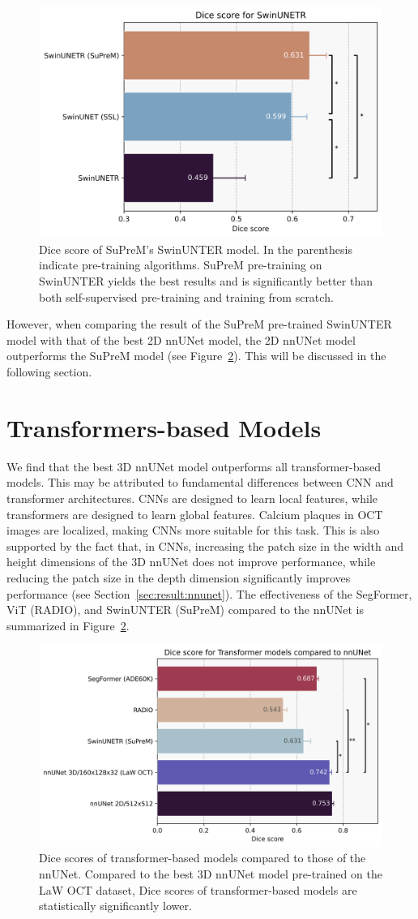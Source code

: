 \documentclass[a4paper,11pt,oneside]{report}
\begin{document}
\begin{figure}[hbt]
    \centering
    \includegraphics[width=0.5\linewidth]{figures/result_SwinUNETR_results.png}
    \caption{Dice score of SuPreM's SwinUNTER model. In the parenthesis indicate pre-training algorithms. SuPreM pre-training on SwinUNTER yields the best results and is significantly better than both self-supervised pre-training and training from scratch.}
    \label{fig:suprem-results}
\end{figure}

However, when comparing the result of the SuPreM pre-trained SwinUNTER model with that of the best 2D nnUNet model, the 2D nnUNet model outperforms the SuPreM model (see Figure~\ref{fig:transformer-results}). This will be discussed in the following section.

\section{Transformers-based Models}
We find that the best 3D nnUNet model outperforms all transformer-based models. This may be attributed to fundamental differences between CNN and transformer architectures. CNNs are designed to learn local features, while transformers are designed to learn global features. Calcium plaques in OCT images are localized, making CNNs more suitable for this task. This is also supported by the fact that, in CNNs, increasing the patch size in the width and height dimensions of the 3D nnUNet does not improve performance, while reducing the patch size in the depth dimension significantly improves performance (see Section~\ref{sec:result:nnunet}). The effectiveness of the SegFormer, ViT (RADIO), and SwinUNTER (SuPreM) compared to the nnUNet is summarized in Figure~\ref{fig:transformer-results}.

\begin{figure}[hbt]
    \centering
    \includegraphics[width=0.6\linewidth]{figures/result_nnUNet_vs_Transformer_results.png}
    \caption{Dice scores of transformer-based models compared to those of the nnUNet. Compared to the best 3D nnUNet model pre-trained on the LaW OCT dataset, Dice scores of transformer-based models are statistically significantly lower.}
    \label{fig:transformer-results}
\end{figure}
\end{document}
